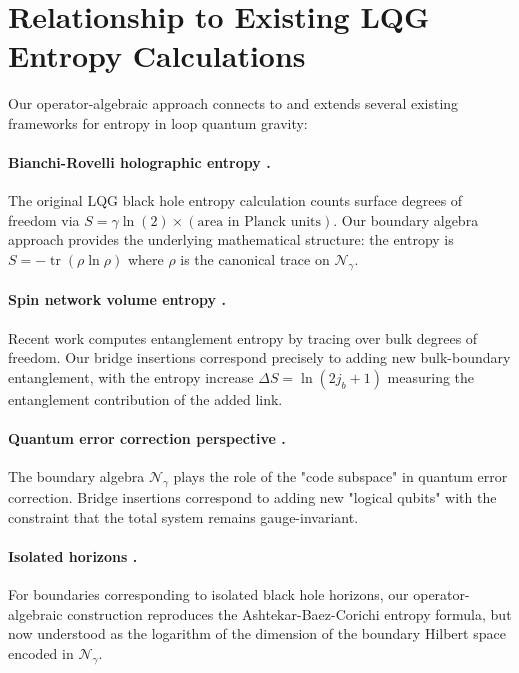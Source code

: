 \documentclass[11pt]{article}
\begin{document}
\section{Relationship to Existing LQG Entropy Calculations}\label{sec:LQG_comparison}

Our operator-algebraic approach connects to and extends several existing frameworks
for entropy in loop quantum gravity:

\paragraph{Bianchi-Rovelli holographic entropy \cite{BianchiRovelli2010}.}
The original LQG black hole entropy calculation counts surface degrees of freedom
via $S = \gamma \ln(2) \times (\text{area in Planck units})$. Our boundary algebra
approach provides the underlying mathematical structure: the entropy is
$S = -\operatorname{tr}(\rho \ln \rho)$ where $\rho$ is the canonical trace on $\mathcal{N}_\gamma$.

\paragraph{Spin network volume entropy \cite{BianchiDonaVilensky2019}.}
Recent work computes entanglement entropy by tracing over bulk degrees of freedom.
Our bridge insertions correspond precisely to adding new bulk-boundary entanglement,
with the entropy increase $\Delta S = \ln(2j_b+1)$ measuring the entanglement
contribution of the added link.

\paragraph{Quantum error correction perspective \cite{DonnellyWall2015}.}
The boundary algebra $\mathcal{N}_\gamma$ plays the role of the "code subspace"
in quantum error correction. Bridge insertions correspond to adding new "logical qubits"
with the constraint that the total system remains gauge-invariant.

\paragraph{Isolated horizons \cite{AshtekarBaezCorichi1998}.}
For boundaries corresponding to isolated black hole horizons, our operator-algebraic
construction reproduces the Ashtekar-Baez-Corichi entropy formula, but now understood
as the logarithm of the dimension of the boundary Hilbert space encoded in $\mathcal{N}_\gamma$.
\end{document}
